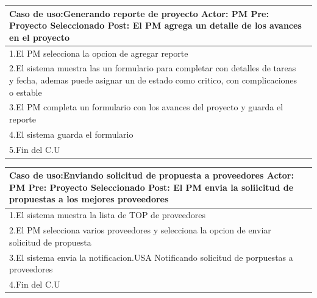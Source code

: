 \begin{longtable}{|p{}|p{}|}
    \hline
    \multicolumn{2}{|p{16cm}|}{
        \textbf{Caso de uso:}Generando reporte de proyecto\newline
        \textbf{Actor:} PM\newline
        \textbf{Pre: }Proyecto Seleccionado\newline
        \textbf{Post:} El PM agrega un detalle de los avances en el proyecto
    }\\
    \hline
    1.El PM selecciona la opcion de agregar reporte &\\
    \hline
    2.El sistema muestra las un formulario para completar con detalles de tareas y fecha, ademas puede asignar un de estado como critico, con complicaciones o estable& \\
    \hline
    3.El PM completa un formulario con los avances del proyecto y guarda el reporte&\\
    \hline
    4.El sistema guarda el formulario&\\
    \hline
    5.Fin del C.U&\\
    \hline
\end{longtable}


\begin{longtable}{|p{}|p{}|}
    \hline
    \multicolumn{2}{|p{16cm}|}{
        \textbf{Caso de uso:}Enviando solicitud de propuesta a proveedores\newline
        \textbf{Actor:} PM\newline
        \textbf{Pre: }Proyecto Seleccionado\newline
        \textbf{Post:} El PM envia la soliicitud de propuestas a los mejores proveedores
    }\\
    \hline
    1.El sistema muestra la lista de TOP de proveedores & \\
    \hline
    2.El PM selecciona varios proveedores y selecciona la opcion de enviar solicitud de propuesta& \\
    \hline
    3.El sistema envia la notificacion.USA Notificando solicitud de porpuestas a proveedores& \\
    \hline
    4.Fin del C.U&\\
    \hline
\end{longtable}

